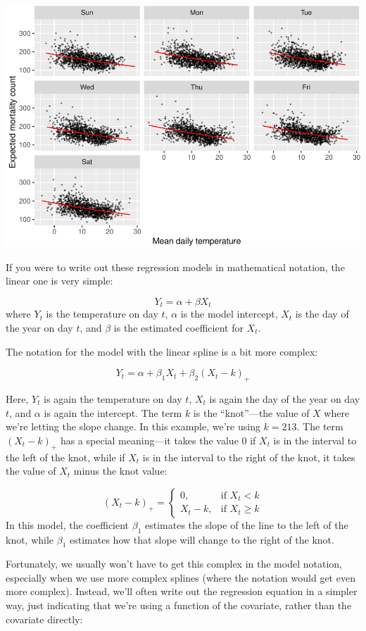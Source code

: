 \documentclass[
]{book}
\begin{document}
\includegraphics{adv_epi_analysis_files/figure-latex/unnamed-chunk-41-1.pdf}

If you were to write out these regression models in mathematical notation, the
linear one is very simple:

\[
Y_t = \alpha + \beta X_t
\]
where \(Y_t\) is the temperature on day \(t\), \(\alpha\) is the model intercept,
\(X_t\) is the day of the year on day \(t\), and \(\beta\) is the estimated coefficient
for \(X_t\).

The notation for the model with the linear spline is a bit more complex:

\[
Y_t = \alpha + \beta_1 X_t + \beta_2 (X_t - k)_+
\]

Here, \(Y_t\) is again the temperature on day \(t\), \(X_t\) is again the day of the year
on day \(t\), and \(\alpha\) is again the intercept. The term \(k\) is the ``knot''---the
value of \(X\) where we're letting the slope change. In this example, we're using
\(k = 213\). The term \((X_t - k)_+\) has a special meaning---it takes the value
0 if \(X_t\) is in the interval to the left of the knot, while if \(X_t\) is in the
interval to the right of the knot, it takes the value of \(X_t\) minus the knot
value:

\[ 
(X_t - k)_+ =
\begin{cases}
0, & \mbox{if } X_t < k \\
X_t - k, & \mbox{if } X_t \ge k 
\end{cases}
\]
In this model, the coefficient \(\beta_1\) estimates the slope of the line to the
left of the knot, while \(\beta_1\) estimates how that slope will change to the
right of the knot.

Fortunately, we usually won't have to get this complex in the model notation,
especially when we use more complex splines (where the notation would get even
more complex). Instead, we'll often write out the
regression equation in a simpler way, just indicating that we're using a function
of the covariate, rather than the covariate directly:
\end{document}
